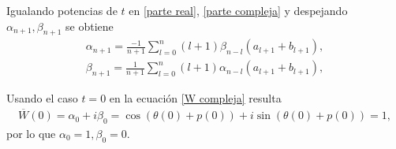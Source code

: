 \documentclass[11pt]{beamer}
\theoremstyle{definition}
\begin{document}
\begin{frame}
Igualando potencias de $t$ en \eqref{parte real}, \eqref{parte compleja} y despejando $\alpha_{n+1},\beta_{n+1}$ se obtiene
\begin{eqnarray}
\alpha_{n+1}=\frac{-1}{n+1}\sum_{l=0}^{n}(l+1)\beta_{n-l}(a_{l+1}+b_{l+1}),
\label{recurrencia alpha}
\end{eqnarray}
\begin{eqnarray}
\beta_{n+1}=\frac{1}{n+1}\sum_{l=0}^{n}(l+1)\alpha_{n-l}(a_{l+1}+b_{l+1}),
\label{recurrencia beta}
\end{eqnarray}

Usando el caso $t=0$ en la ecuación \eqref{W compleja} resulta
\begin{eqnarray}
\overline{W}(0)=\alpha_{0}+i\beta_{0}=\cos(\theta(0)+p(0))+i\sin(\theta(0)+p(0))=1,
\end{eqnarray}
por lo que $\alpha_{0}=1,\beta_{0}=0$.
\end{frame}
\end{document}
